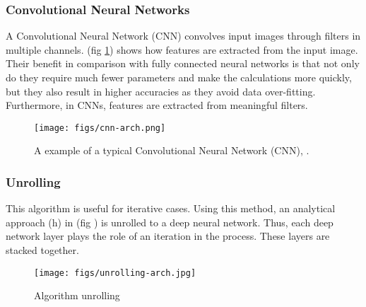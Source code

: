 \documentclass[conference, 11pt]{IEEEtran}
\begin{document}
	\subsubsection{Convolutional Neural Networks \cite{Ozcan2019}}
	A Convolutional Neural Network (CNN) convolves input images through filters in multiple channels. (fig \ref{img:cnn}) shows how features are extracted from the input image. Their benefit in comparison with fully connected neural networks is that not only do they require much fewer parameters and make the calculations more quickly, but they also result in higher accuracies as they avoid data over-fitting. Furthermore, in CNNs, features are extracted from meaningful filters.
	
	
	\begin{figure}[!htbp]
		\texttt{[image: figs/cnn-arch.png]}
		\centering
		\caption{A example of a typical Convolutional Neural Network (CNN), \cite{wiki:cnn}.
			\label{img:cnn}}
	\end{figure}
	
	\subsubsection{Unrolling \cite{Li2019-2}}
	This algorithm is useful for iterative cases. Using this method, an analytical approach (h) in (fig \label{img:unrolling}) is unrolled to a deep neural network. Thus, each deep network layer plays the role of an iteration in the process. These layers are stacked together.
	
	
	\begin{figure}[!htbp]
		\texttt{[image: figs/unrolling-arch.jpg]}
		\centering
		\caption{Algorithm unrolling \cite{Shlezinger2021}}
		\label{img:unrolling}
	\end{figure}
	
	
\end{document}
